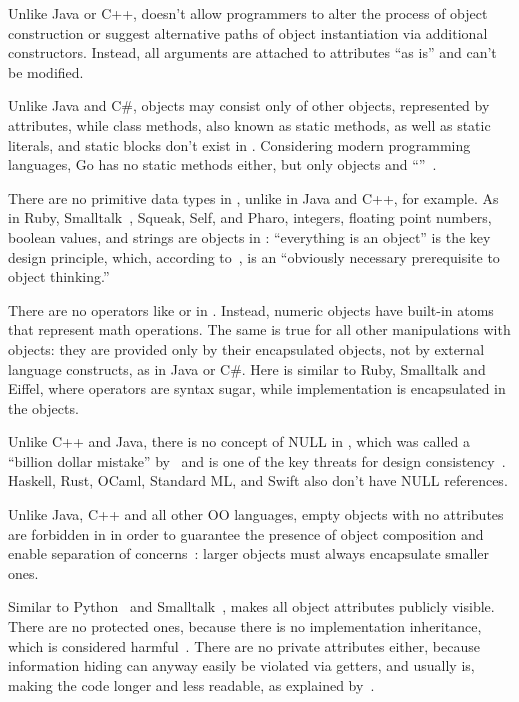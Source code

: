 %
Unlike Java or C++, \eolang{} doesn't allow programmers to alter
the process of object construction or suggest alternative
paths of object instantiation via additional constructors.
Instead, all arguments are attached to attributes ``as is'' and can't be modified.

%
Unlike Java and C\#,
\eolang{} objects may consist only of other objects, represented
by attributes, while class methods, also known as static methods, as well as
static literals, and static blocks don't exist in \eolang{}.
Considering modern programming languages, Go has no static methods either,
but only objects and ``''~\citep{schmager2010gohotdraw}.

%
There are no primitive data types in \eolang{}, unlike
in Java and C++, for example.
As in Ruby, Smalltalk~\citep*{goldbergrobson1983smalltalk}, Squeak, Self, and Pharo,
integers, floating point numbers, boolean
values, and strings are objects in \eolang{}:
``everything is an object'' is the key design principle, which,
according to~\citet[p.66]{west2004object}, is an ``obviously necessary prerequisite
to object thinking.''

%
There are no operators like \ff{+} or \ff{/} in \eolang{}. Instead,
numeric objects have built-in atoms that represent math operations. The same
is true for all other manipulations with objects: they are provided
only by their encapsulated objects, not by external language constructs, as in
Java or C\#. Here \eolang{} is similar to Ruby, Smalltalk and Eiffel,
where operators are syntax sugar, while implementation is encapsulated in
the objects.

%
Unlike C++ and Java, there is no concept of NULL in \eolang{}, which
was called a ``billion dollar mistake'' by~\citet{hoare2009null} and
is one of the key threats for design consistency~\citep{eo1}.
Haskell, Rust, OCaml, Standard ML, and Swift also don't have NULL references.

%
Unlike Java, C++ and all other OO languages,
empty objects with no attributes are forbidden in \eolang{} in order
to guarantee the presence of object composition and
enable separation of concerns~\citep{dijkstra1982role}:
larger objects must always encapsulate smaller ones.

%
Similar to Python~\citep{lutz2013learning} and Smalltalk~\citep{hunt1997smalltalk},
\eolang{} makes all object attributes publicly visible.
There are no protected ones, because there is no implementation
inheritance, which is considered harmful~\citep{hunt2000}.
There are no private attributes either, because information
hiding can anyway easily be violated via getters, and usually is, making the code longer
and less readable, as explained by~\citet{holub2004more}.

